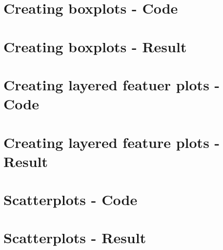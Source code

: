\section{Creating boxplots - Code} %
\label{app:source-boxplots}

\section{Creating boxplots - Result} %
\label{app:result-boxplots}

\section{Creating layered featuer plots - Code} %
\label{app:source-layered-feature-plots}


\section{Creating layered feature plots - Result} %
\label{app:result-layered-feature-plots}


\section{Scatterplots - Code} %
\label{app:source-scatterplots}

\section{Scatterplots - Result} %
\label{app:result-scatterplots}

